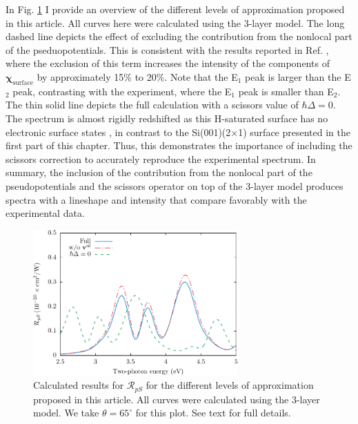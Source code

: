 In Fig. \ref{fig:improvements} I provide an overview of the different levels of
approximation proposed in this article. All curves here were calculated using
the 3-layer model. The long dashed line depicts the effect of excluding the
contribution from the nonlocal part of the pseduopotentials. This is consistent
with the results reported in Ref. \cite{andersonPRB15}, where the exclusion of
this term increases the intensity of the components of
$\boldsymbol{\chi}_{\mathrm{surface}}$ by approximately 15\% to 20\%. Note that
the E$_{1}$ peak is larger than the E$_{2}$ peak, contrasting with the
experiment, where the E$_{1}$ peak is smaller than E$_{2}$. The thin solid line
depicts the full calculation with a scissors value of $\hbar\Delta = 0$. The
spectrum is almost rigidly redshifted as this H-saturated surface has no
electronic surface states \cite{andersonPRB15}, in contrast to the
Si(001)(2$\times$1) surface presented in the first part of this chapter. Thus,
this demonstrates the importance of including the scissors correction to
accurately reproduce the experimental spectrum. In summary, the inclusion of the
contribution from the nonlocal part of the pseudopotentials and the scissors
operator on top of the 3-layer model produces spectra with a lineshape and
intensity that compare favorably with the experimental data.

\begin{figure}[H]
\centering
\includegraphics[width=0.7\textwidth]
{content/figures/fig-Si1x1-Mejia_RpS_improvements}
\caption{Calculated results for $\mathcal{R}_{pS}$ for the different levels of
approximation proposed in this article. All curves were calculated using the
3-layer model. We take $\theta=65^{\circ}$ for this plot. See text for full
details.}
\label{fig:improvements}
\end{figure}

